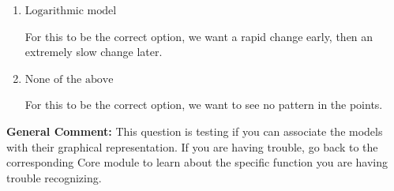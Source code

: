 \documentclass{extbook}[14pt]
\begin{document}
\begin{enumerate}
{\begin{enumerate}[label=\Alph*.]
For this to be the correct option, we want an extremely slow change early, then a rapid change later.
\item \( \text{Logarithmic model} \)

For this to be the correct option, we want a rapid change early, then an extremely slow change later.
\item \( \text{None of the above} \)

For this to be the correct option, we want to see no pattern in the points.
\end{enumerate}

\textbf{General Comment:} This question is testing if you can associate the models with their graphical representation. If you are having trouble, go back to the corresponding Core module to learn about the specific function you are having trouble recognizing.
}
\end{enumerate}
\end{document}
